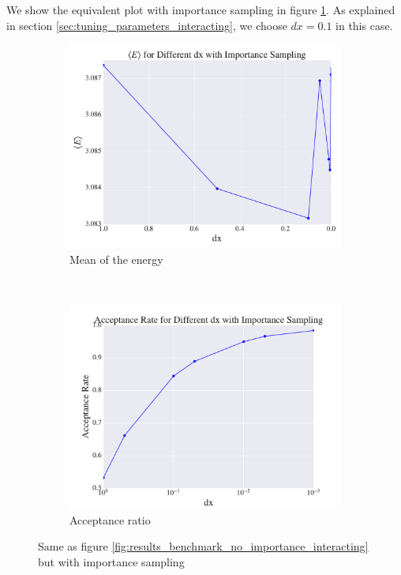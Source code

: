 \documentclass[a4paper, 10pt]{article}
\begin{document}
	 \linebreak
	 We show the equivalent plot with importance sampling in figure \ref{fig:results_benchmark_importance_interacting}. As explained in section \ref{sec:tuning_parameters_interacting}, we choose $dx=0.1$ in this case.
	 \begin{figure}[ht!]
	 	\centering
	 	\begin{subfigure}[b]{0.8\textwidth}
	 		\centering
	 		\includegraphics[width=\textwidth]{../Results/E_v_dx_importance_interacting.pdf}
	 		\caption{Mean of the energy}
	 	\end{subfigure}
	 	~
	 	\begin{subfigure}[b]{0.8\textwidth}
	 		\centering
	 		\includegraphics[width=\textwidth]{../Results/AC_importance_interacting.pdf}
	 		\caption{Acceptance ratio}
	 	\end{subfigure}
	 	\caption{Same as figure \ref{fig:results_benchmark_no_importance_interacting} but with importance sampling}\label{fig:results_benchmark_importance_interacting}
	 \end{figure}
\end{document}
